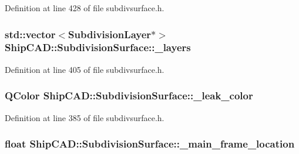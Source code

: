 Definition at line 428 of file subdivsurface.\-h.

\hypertarget{classShipCAD_1_1SubdivisionSurface_a87c6c8b63f203d788b8f4b361c814c96}{
\subsubsection[{\-\_\-layers}]{\setlength{\rightskip}{0pt plus 5cm}std\-::vector$<${\bf Subdivision\-Layer}$\ast$$>$ Ship\-C\-A\-D\-::\-Subdivision\-Surface\-::\-\_\-layers\hspace{0.3cm}{\ttfamily [protected]}}}\label{classShipCAD_1_1SubdivisionSurface_a87c6c8b63f203d788b8f4b361c814c96}


Definition at line 405 of file subdivsurface.\-h.

\hypertarget{classShipCAD_1_1SubdivisionSurface_aacd1616b97a4425cc9b1051e01785596}{
\subsubsection[{\-\_\-leak\-\_\-color}]{\setlength{\rightskip}{0pt plus 5cm}Q\-Color Ship\-C\-A\-D\-::\-Subdivision\-Surface\-::\-\_\-leak\-\_\-color\hspace{0.3cm}{\ttfamily [protected]}}}\label{classShipCAD_1_1SubdivisionSurface_aacd1616b97a4425cc9b1051e01785596}


Definition at line 385 of file subdivsurface.\-h.

\hypertarget{classShipCAD_1_1SubdivisionSurface_a3ea08aa45ad221a1b485010ce5e8dee7}{
\subsubsection[{\-\_\-main\-\_\-frame\-\_\-location}]{\setlength{\rightskip}{0pt plus 5cm}float Ship\-C\-A\-D\-::\-Subdivision\-Surface\-::\-\_\-main\-\_\-frame\-\_\-location\hspace{0.3cm}{\ttfamily [protected]}}}\label{classShipCAD_1_1SubdivisionSurface_a3ea08aa45ad221a1b485010ce5e8dee7}


